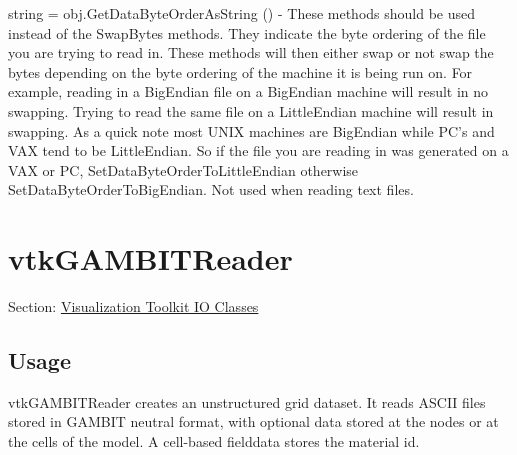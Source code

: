 \begin{DoxyItemize}
\item {\ttfamily string = obj.\-Get\-Data\-Byte\-Order\-As\-String ()} -\/ These methods should be used instead of the Swap\-Bytes methods. They indicate the byte ordering of the file you are trying to read in. These methods will then either swap or not swap the bytes depending on the byte ordering of the machine it is being run on. For example, reading in a Big\-Endian file on a Big\-Endian machine will result in no swapping. Trying to read the same file on a Little\-Endian machine will result in swapping. As a quick note most U\-N\-I\-X machines are Big\-Endian while P\-C's and V\-A\-X tend to be Little\-Endian. So if the file you are reading in was generated on a V\-A\-X or P\-C, Set\-Data\-Byte\-Order\-To\-Little\-Endian otherwise Set\-Data\-Byte\-Order\-To\-Big\-Endian. Not used when reading text files.  
\end{DoxyItemize}\hypertarget{vtkio_vtkgambitreader}{}\section{vtk\-G\-A\-M\-B\-I\-T\-Reader}\label{vtkio_vtkgambitreader}
Section\-: \hyperlink{sec_vtkio}{Visualization Toolkit I\-O Classes} \hypertarget{vtkwidgets_vtkxyplotwidget_Usage}{}\subsection{Usage}\label{vtkwidgets_vtkxyplotwidget_Usage}
vtk\-G\-A\-M\-B\-I\-T\-Reader creates an unstructured grid dataset. It reads A\-S\-C\-I\-I files stored in G\-A\-M\-B\-I\-T neutral format, with optional data stored at the nodes or at the cells of the model. A cell-\/based fielddata stores the material id.

